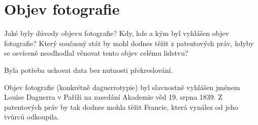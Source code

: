\section{Objev fotografie}
Jaké byly důvody objevu fotografie? Kdy, kde a kým byl vyhlášen objev fotografie? Který současný stát by mohl 
dodnes těžit z patentových práv, kdyby se osvíceně neodhodlal věnovat tento objev celému lidstvu?

Byla potřeba uchovat data bez nutnosti překreslování. 

Objev fotografie (konkrétně daguerrotypie) byl slavnostně vyhlášen jménem Louise Daguerra v Paříži na zasedání Akademie 
věd 19. srpna 1839. Z patentových práv by tak dodnes mohla těžit Francie, která vynález od jeho tvůrců odkoupila.